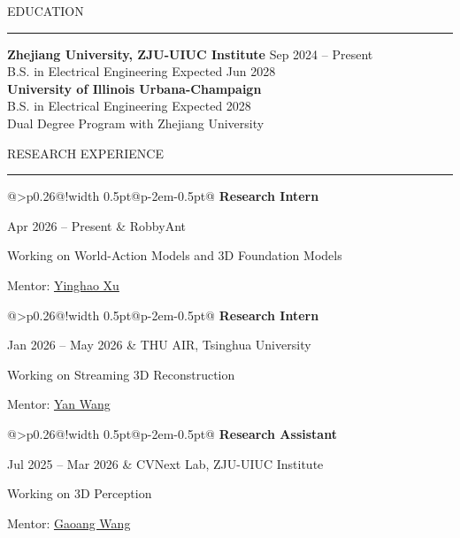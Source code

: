 \documentclass{resume} %
\makeatletter
\newcommand{\experienceentry}[5]{%
  \noindent\begin{tabular}{@{}>{\raggedleft\arraybackslash}p{0.26\linewidth}@{\hspace{1em}}!{\color{gray!50}\vrule width 0.5pt}@{\hspace{1em}}p{\dimexpr0.74\linewidth-2em-0.5pt\relax}@{}}
    \textbf{#1}\par #2 & #3\par Working on #4\par {\small\textcolor{gray!80!black}{#5}}
  \end{tabular}\par
}
\renewenvironment{rSection}[1]{
\sectionskip
\textcolor{TsinghuaPurple}{\MakeUppercase{#1}}
\sectionlineskip
\hrule
\begin{list}{}{
\setlength{\leftmargin}{0em}
}
\item[]
}{
\end{list}
}
\makeatother
\begin{document}
  


\begin{rSection}{Education}
\vspace{0.3em}
{\bf Zhejiang University, ZJU-UIUC Institute} \hfill {Sep 2024 -- Present}\\
B.S. in Electrical Engineering \hfill {Expected Jun 2028}\\
\textbf{University of Illinois Urbana-Champaign}\\
B.S. in Electrical Engineering \hfill {Expected 2028}\\
{\small Dual Degree Program with Zhejiang University}
\end{rSection} 






\begin{rSection}{Research Experience}
\vspace{0.3em}
\experienceentry{Research Intern}{Apr 2026 -- Present}{RobbyAnt}{World-Action Models and 3D Foundation Models}{Mentor: \href{https://justimyhxu.github.io/}{Yinghao Xu}}
\vspace{0.6em}
\experienceentry{Research Intern}{Jan 2026 -- May 2026}{THU AIR, Tsinghua University}{Streaming 3D Reconstruction}{Mentor: \href{https://yanwang202199.github.io/}{Yan Wang}}
\vspace{0.6em}
\experienceentry{Research Assistant}{Jul 2025 -- Mar 2026}{CVNext Lab, ZJU-UIUC Institute}{3D Perception}{Mentor: \href{https://cvnext.github.io/}{Gaoang Wang}}
\end{rSection}
\end{document}
